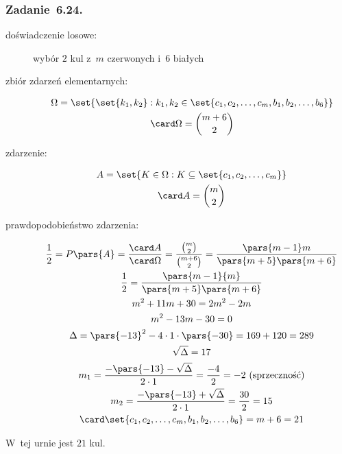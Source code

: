 \subsubsection*{Zadanie~6.24.}
\begin{description}
    \item[doświadczenie losowe:] wybór \(2\) kul z~\(m\) czerwonych i~\(6\) białych
    \item[zbiór zdarzeń elementarnych:]
        \begin{gather*}
            \Omega = \set{\set{k_1, k_2} : k_1, k_2 \in \set{c_1, c_2, \ldots, c_m, b_1, b_2, \ldots, b_6 }}\\
            \card\Omega = \binom{m + 6}{2}
        \end{gather*}
    \item[zdarzenie:]
        \begin{gather*}
            A = \set{K \in \Omega : K \subseteq \set{c_1, c_2, \ldots, c_m}}\\
            \card A = \binom{m}{2}
        \end{gather*}
    \item[prawdopodobieństwo zdarzenia:]
        \begin{gather*}
            \frac{1}{2}
                = P\pars{A}
                = \frac{\card A}{\card\Omega}
                = \frac{\binom{m}{2}}{\binom{m + 6}{2}}
                = \frac{\pars{m - 1}m}{\pars{m + 5}\pars{m + 6}}\\
            \frac{1}{2} = \frac{\pars{m - 1}{m}}{\pars{m + 5}\pars{m + 6}}\\
            m^2 + 11m + 30 = 2m^2 - 2m\\
            m^2 - 13m - 30 = 0\\
            \Delta
                = \pars{-13}^2 - 4 \cdot 1 \cdot \pars{-30}
                = 169 + 120
                = 289\\
            \sqrt{\Delta} = 17\\
            m_1
                = \frac{-\pars{-13} - \sqrt{\Delta}}{2 \cdot 1}
                = \frac{-4}{2}
                = -2 \text{ (sprzeczność)}\\
            m_2
                = \frac{-\pars{-13} + \sqrt{\Delta}}{2 \cdot 1}
                = \frac{30}{2}
                = 15\\
            \card\set{c_1, c_2, \ldots, c_m, b_1, b_2, \ldots, b_6} = m + 6 = 21
        \end{gather*}
\end{description}
W~tej urnie jest \(21\) kul.

